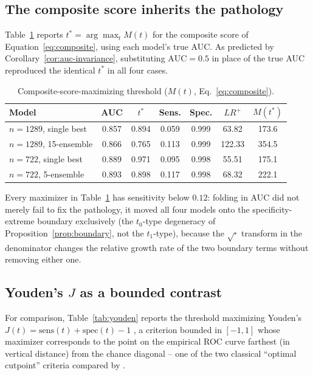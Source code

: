 \documentclass[11pt]{article}
\begin{document}
\subsection{The composite score inherits the pathology}

Table~\ref{tab:composite} reports $t^\ast = \arg\max_t M(t)$ for the
composite score of Equation~\ref{eq:composite}, using each model's true
AUC. As predicted by Corollary~\ref{cor:auc-invariance}, substituting
$\mathrm{AUC} = 0.5$ in place of the true AUC reproduced the identical
$t^\ast$ in all four cases.

\begin{table}[ht]
\centering
\caption{Composite-score-maximizing threshold ($M(t)$, Eq.~\ref{eq:composite}).}
\label{tab:composite}
\begin{tabular}{lcccccc}
\toprule
Model & AUC & $t^\ast$ & Sens. & Spec. & $LR^+$ & $M(t^\ast)$ \\
\midrule
$n{=}1289$, single best   & 0.857 & 0.894 & 0.059 & 0.999 & 63.82  & 173.6 \\
$n{=}1289$, 15-ensemble   & 0.866 & 0.765 & 0.113 & 0.999 & 122.33 & 354.5 \\
$n{=}722$, single best    & 0.889 & 0.971 & 0.095 & 0.998 & 55.51  & 175.1 \\
$n{=}722$, 5-ensemble     & 0.893 & 0.898 & 0.117 & 0.998 & 68.32  & 222.1 \\
\bottomrule
\end{tabular}
\end{table}

Every maximizer in Table~\ref{tab:composite} has sensitivity below $0.12$:
folding in AUC did not merely fail to fix the pathology, it moved all four
models onto the specificity-extreme boundary exclusively (the $t_0$-type
degeneracy of Proposition~\ref{prop:boundary}, not the $t_1$-type), because
the $\sqrt{\cdot}$ transform in the denominator changes the relative growth
rate of the two boundary terms without removing either one.

\subsection{Youden's $J$ as a bounded contrast}

For comparison, Table~\ref{tab:youden} reports the threshold maximizing
Youden's $J(t) = \mathrm{sens}(t) + \mathrm{spec}(t) - 1$
\citep{youden1950}, a criterion bounded in $[-1,1]$ whose maximizer
corresponds to the point on the empirical ROC curve farthest (in vertical
distance) from the chance diagonal -- one of the two classical ``optimal
cutpoint'' criteria compared by \citet{perkins2006}.
\end{document}
